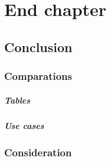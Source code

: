 \chapter{End chapter}

\section{Conclusion}

\subsection{Comparations}
    \paragraph{Tables}
    \paragraph{Use cases}

\subsection{Consideration}